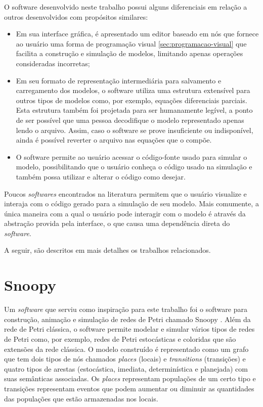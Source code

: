 \documentclass[
	12pt,				%
	openright,			%
	oneside,			%
	a4paper,			%
	main=brazil,
	english,			%
	]{ufsj-abntex2}
\begin{document}
O software desenvolvido neste trabalho possui alguns diferenciais em relação a outros desenvolvidos com propósitos similares:

\begin{itemize}
    \item Em sua interface gráfica, é apresentado um editor baseado em nós que fornece ao usuário uma forma de programação visual \ref{sec:programacao-visual} que facilita a construção e simulação de modelos, limitando apenas operações consideradas incorretas;
    
    \item Em seu formato de representação intermediária para salvamento e carregamento dos modelos, o software utiliza uma estrutura extensível para outros tipos de modelos como, por exemplo, equações diferenciais parciais. Esta estrutura também foi projetada para ser humanamente legível, a ponto de ser possível que uma pessoa decodifique o modelo representado apenas lendo o arquivo. Assim, caso o software se prove insuficiente ou indisponível, ainda é possível reverter o arquivo nas equações que o compõe. 
    
    \item O software permite ao usuário acessar o código-fonte usado para simular o modelo, possibilitando que o usuário conheça o código usado na simulação e também possa utilizar e alterar o código como desejar.   
\end{itemize}

Poucos \textit{softwares} encontrados na literatura permitem que o usuário visualize e interaja com o código gerado para a simulação de seu modelo. Mais comumente, a única maneira com a qual o usuário pode interagir com o modelo é através da abstração provida pela interface, o que causa uma dependência direta do \textit{software}.

A seguir, são descritos em mais detalhes os trabalhos relacionados. 

\section{Snoopy}

Um \textit{software} que serviu como inspiração para este trabalho foi o software para construção, animação e simulação de redes de Petri chamado Snoopy \cite{Heiner2008,Heiner2012,Liu2012}. Além da rede de Petri clássica, o software permite modelar e simular vários tipos de redes de Petri como, por exemplo, redes de Petri estocásticas e coloridas que são extensões da rede clássica. O modelo construído é representado como um grafo que tem dois tipos de nós chamados \textit{places} (locais) e \textit{transitions} (transições) e quatro tipos de arestas (estocástica, imediata, determinística e planejada) com suas semânticas associadas. Os \textit{places} representam populações de um certo tipo e transições representam eventos que podem aumentar ou diminuir as quantidades das populações que estão armazenadas nos locais. 
\end{document}
